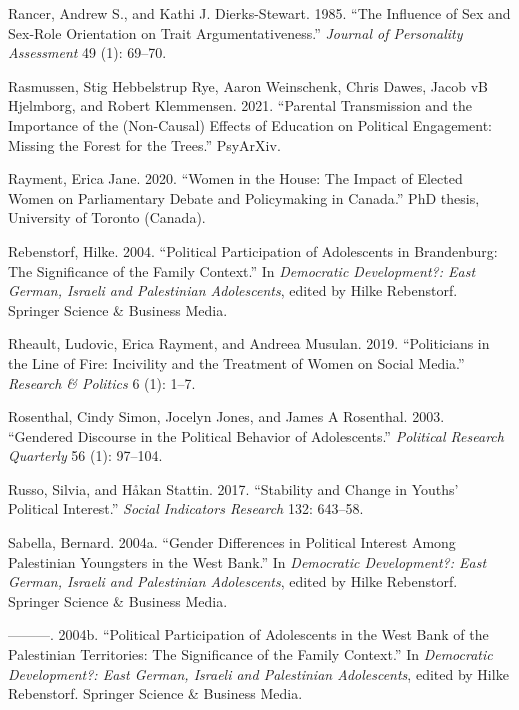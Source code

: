 \documentclass[
  letterpaper,
  DIV=11,
  numbers=noendperiod]{scrreprt}
\newlength{\cslhangindent}
\newlength{\cslentryspacingunit} %
\newenvironment{CSLReferences}[2] %
 {%
  \setlength{\parindent}{0pt}
  \ifodd #1
  \let\oldpar\par
  \def\par{\hangindent=\cslhangindent\oldpar}
  \fi
  \setlength{\parskip}{#2\cslentryspacingunit}
 }%
 {}
\begin{document}
\begin{CSLReferences}{1}{0}
\leavevmode{}%
Rancer, Andrew S., and Kathi J. Dierks-Stewart. 1985. {``{The Influence
of Sex and Sex-Role Orientation on Trait Argumentativeness}.''}
\emph{Journal of Personality Assessment} 49 (1): 69--70.

\leavevmode{}%
Rasmussen, Stig Hebbelstrup Rye, Aaron Weinschenk, Chris Dawes, Jacob vB
Hjelmborg, and Robert Klemmensen. 2021. {``{Parental Transmission and
the Importance of the (Non-Causal) Effects of Education on Political
Engagement: Missing the Forest for the Trees}.''} PsyArXiv.

\leavevmode{}%
Rayment, Erica Jane. 2020. {``{Women in the House: The Impact of Elected
Women on Parliamentary Debate and Policymaking in Canada}.''} PhD
thesis, University of Toronto (Canada).

\leavevmode{}%
Rebenstorf, Hilke. 2004. {``{Political Participation of Adolescents in
Brandenburg: The Significance of the Family Context}.''} In
\emph{{Democratic Development?: East German, Israeli and Palestinian
Adolescents}}, edited by Hilke Rebenstorf. Springer Science \& Business
Media.

\leavevmode{}%
Rheault, Ludovic, Erica Rayment, and Andreea Musulan. 2019.
{``{Politicians in the Line of Fire: Incivility and the Treatment of
Women on Social Media}.''} \emph{Research \& Politics} 6 (1): 1--7.

\leavevmode{}%
Rosenthal, Cindy Simon, Jocelyn Jones, and James A Rosenthal. 2003.
{``{Gendered Discourse in the Political Behavior of Adolescents}.''}
\emph{Political Research Quarterly} 56 (1): 97--104.

\leavevmode{}%
Russo, Silvia, and Håkan Stattin. 2017. {``Stability and Change in
Youths' Political Interest.''} \emph{Social Indicators Research} 132:
643--58.

\leavevmode{}%
Sabella, Bernard. 2004a. {``{Gender Differences in Political Interest
Among Palestinian Youngsters in the West Bank}.''} In \emph{{Democratic
Development?: East German, Israeli and Palestinian Adolescents}}, edited
by Hilke Rebenstorf. Springer Science \& Business Media.

\leavevmode{}%
---------. 2004b. {``{Political Participation of Adolescents in the West
Bank of the Palestinian Territories: The Significance of the Family
Context}.''} In \emph{{Democratic Development?: East German, Israeli and
Palestinian Adolescents}}, edited by Hilke Rebenstorf. Springer Science
\& Business Media.


\end{CSLReferences}
\end{document}
